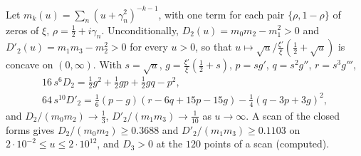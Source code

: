 \begin{proposition}\label{c:prop:firstrung}
Let $m_k(u)=\sum_n(u+\gamma_n^2)^{-k-1}$, with one term for each pair $\{\rho,1-\rho\}$ of zeros of $\xi$, $\rho=\frac12+i\gamma_n$. Unconditionally, $D_2(u)=m_0m_2-m_1^2>0$ and $D'_2(u)=m_1m_3-m_2^2>0$ for every $u>0$, so that $u\mapsto\sqrt u\big/\frac{\xi'}\xi(\frac12+\sqrt u)$ is concave on $(0,\infty)$. With $s=\sqrt u$, $g=\frac{\xi'}\xi(\frac12+s)$, $p=sg'$, $q=s^2g''$, $r=s^3g'''$,
\begin{gather*}
16\,s^6D_2=\tfrac12g^2+\tfrac12gp+\tfrac12gq-p^2,\\
64\,s^{10}D'_2=\tfrac16(p-g)(r-6q+15p-15g)-\tfrac14(q-3p+3g)^2,
\end{gather*}
and $D_2/(m_0m_2)\to\frac13$, $D'_2/(m_1m_3)\to\frac1{10}$ as $u\to\infty$. A scan of the closed forms gives $D_2/(m_0m_2)\ge0.3688$ and $D'_2/(m_1m_3)\ge0.1103$ on $2\cdot10^{-2}\le u\le2\cdot10^{12}$, and $D_3>0$ at the $120$ points of a scan (computed).
\end{proposition}

